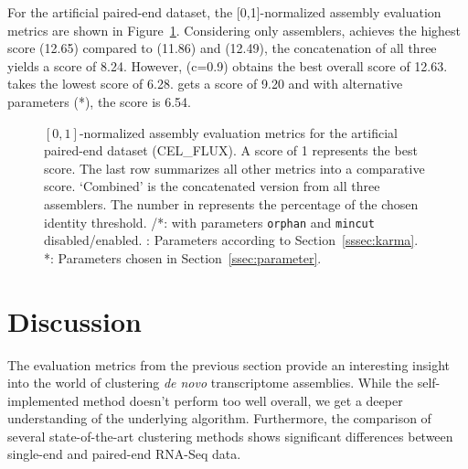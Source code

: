 \documentclass[12pt,a4paper,english]{article}
\begin{document}
	\newpage
    For the artificial paired-end \celegans dataset, the [0,1]-normalized assembly evaluation metrics are shown in Figure~\ref{img:cel_flux}. Considering only assemblers, \trinity achieves the highest score (12.65) compared to \soap (11.86) and \spades (12.49), the concatenation of all three yields a score of 8.24.
	However, \cdhit (c=0.9) obtains the best overall score of 12.63. \grouper takes the lowest score of 6.28. \karma gets a score of 9.20 and with alternative parameters (\karma{}*), the score is 6.54.

	\begin{figure}[H]
		\hspace{-13pt}
		\def\svgwidth{1.1\textwidth}
		
		\caption[Normalized assembly evaluation metrics (\celegans, PE, CEL\_FLUX).]{$[0,1]$-normalized assembly evaluation metrics for the artificial paired-end \celegans dataset (CEL\_FLUX). A score of 1 represents the best score. The last row summarizes all other metrics into a comparative score. `Combined' is the concatenated version from all three assemblers. The number in \cdhit represents the percentage of the chosen identity threshold. \grouper/\grouper{}*: \grouper with parameters \texttt{orphan} and \texttt{mincut} disabled/enabled. \karma: Parameters according to Section~\ref{sssec:karma}. \karma{}*: Parameters chosen in Section~\ref{ssec:parameter}.}
		\label{img:cel_flux}
	\end{figure}


\newpage
\section{Discussion}
	The evaluation metrics from the previous section provide an interesting insight into the world of clustering \textit{de novo} transcriptome assemblies.
	While the self-implemented method \karma doesn't perform too well overall, we get a deeper understanding of the underlying algorithm. Furthermore, the comparison of several state-of-the-art clustering methods shows significant differences between single-end and paired-end RNA-Seq data.
\end{document}
